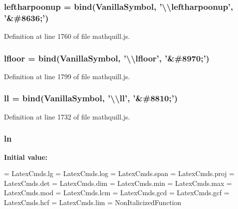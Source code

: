 \subsubsection[{leftharpoonup}]{ leftharpoonup = {\bf bind}({\bf Vanilla\-Symbol}, '\textbackslash{}\textbackslash{}leftharpoonup', '\&\#8636;')}\label{mathquill_8js_a5b87a549394f65641ee95a42d1bffdb2}


Definition at line 1760 of file mathquill.\-js.

\subsubsection[{lfloor}]{ lfloor = {\bf bind}({\bf Vanilla\-Symbol}, '\textbackslash{}\textbackslash{}lfloor', '\&\#8970;')}\label{mathquill_8js_a39b38ed604809fb25d4fd858d4e6b36a}


Definition at line 1799 of file mathquill.\-js.

\subsubsection[{ll}]{ ll = {\bf bind}({\bf Vanilla\-Symbol}, '\textbackslash{}\textbackslash{}ll', '\&\#8810;')}\label{mathquill_8js_a793c14fe55f60ea2721d25a8b0585194}


Definition at line 1732 of file mathquill.\-js.

\subsubsection[{ln}]{ ln}\label{mathquill_8js_a1824cc64a9edab0d19c16e8b5b528ee1}
{\bfseries Initial value\-:}
\begin{DoxyCode}
=
LatexCmds.lg =
LatexCmds.log =
LatexCmds.span =
LatexCmds.proj =
LatexCmds.det =
LatexCmds.dim =
LatexCmds.min =
LatexCmds.max =
LatexCmds.mod =
LatexCmds.lcm =
LatexCmds.gcd =
LatexCmds.gcf =
LatexCmds.hcf =
LatexCmds.lim = NonItalicizedFunction
\end{DoxyCode}


